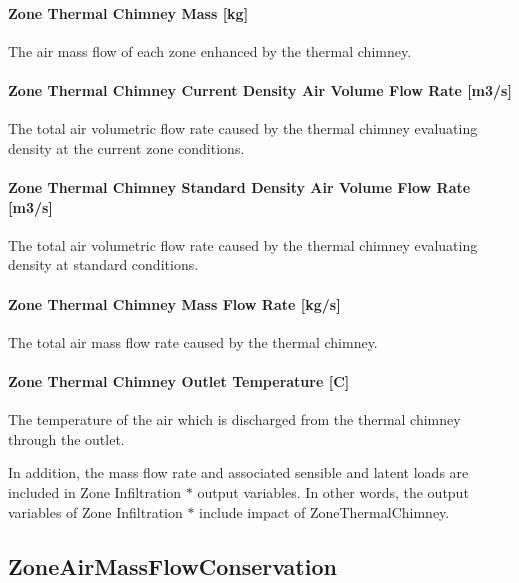 \paragraph{Zone Thermal Chimney Mass {[}kg{]}}\label{zone-thermal-chimney-mass-kg}

The air mass flow of each zone enhanced by the thermal chimney.

\paragraph{Zone Thermal Chimney Current Density Air Volume Flow Rate {[}m3/s{]}}\label{zone-thermal-chimney-current-density-volumetric-flow-rate-m3s}

The total air volumetric flow rate caused by the thermal chimney evaluating density at the current zone conditions.

\paragraph{Zone Thermal Chimney Standard Density Air Volume Flow Rate {[}m3/s{]}}\label{zone-thermal-chimney-standard-density-volumetric-flow-rate-m3s}

The total air volumetric flow rate caused by the thermal chimney evaluating density at standard conditions.

\paragraph{Zone Thermal Chimney Mass Flow Rate {[}kg/s{]}}\label{zone-thermal-chimney-mass-flow-rate-kgs}

The total air mass flow rate caused by the thermal chimney.

\paragraph{Zone Thermal Chimney Outlet Temperature {[}C{]}}\label{zone-thermal-chimney-outlet-temperature-c}

The temperature of the air which is discharged from the thermal chimney through the outlet.

In addition, the mass flow rate and associated sensible and latent loads are included in Zone Infiltration $*$ output variables. In other words, the output variables of Zone Infiltration $*$ include impact of ZoneThermalChimney.

\subsection{ZoneAirMassFlowConservation}\label{zoneairmassflowconservation}

